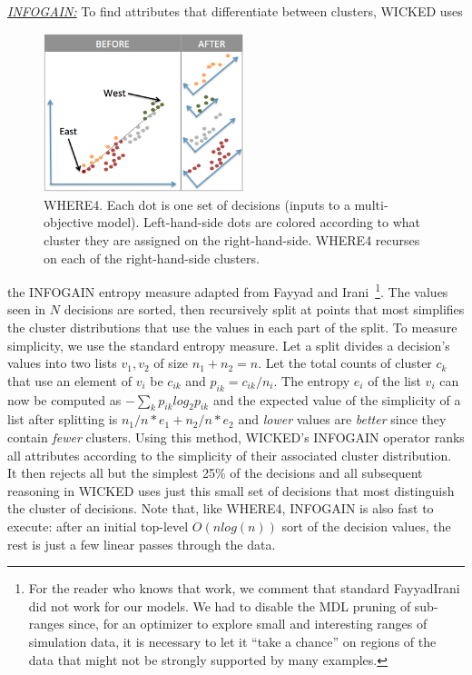 \documentclass[runningheads]{llncs}
\begin{document}
\underline{{\em INFOGAIN:}} To find attributes that differentiate between clusters,
WICKED uses 
\begin{figure}
\includegraphics[width=2.3in]{4WAY.png}
\caption{WHERE4. Each dot is
one set of decisions (inputs to a multi-objective model).
Left-hand-side dots are colored according to what cluster they are assigned on the right-hand-side.
WHERE4 recurses on each of the right-hand-side clusters.
}\label{fig:4WAY}
\end{figure}
the INFOGAIN entropy measure adapted from
Fayyad and Irani~\cite{FayIra93Multi}\footnote{For the reader
who knows that work, we comment that standard
FayyadIrani did not work for our models. We had to disable
the MDL pruning of sub-ranges since, for an optimizer to explore  small
and interesting ranges of simulation data, it is necessary
to let it ``take a chance'' on regions of the data that might not
be strongly supported by many examples.}. The values seen
in $N$
decisions are sorted, then recursively split at points that
most simplifies the cluster distributions that use the values
in each part of the split. To measure simplicity, we use the
standard entropy measure. Let a split divides a decision's
values into two
lists  $v_1,v_2$ of size $n_1+n_2=n$. Let  the total counts
of cluster $c_k$ that use an element of $v_i$ be $c_{ik}$
and 
$p_{ik} = c_{ik}/n_i$. The entropy $e_i$ of the list $v_i$ can now be computed
as 
$-\sum_{k}p_{ik}log_2{p_{ik}}$ and the expected value of the simplicity
of a list after splitting is 
\mbox{$n_1/n*e_1 + n_2/n*e_2$} 
and {\em lower} values are {\em better} since they contain {\em fewer}
clusters.
Using this method, WICKED's INFOGAIN operator ranks 
all attributes according to the  simplicity of their associated
cluster distribution. It then rejects all but the simplest
25\% of the decisions and all subsequent reasoning in WICKED
uses just this small set of decisions that most distinguish
the cluster of decisions. Note that, like WHERE4, INFOGAIN is
also fast to execute: after an initial top-level 
$O(nlog(n))$
sort of the decision values, the rest is just a
few linear
passes through the data.
\end{document}
